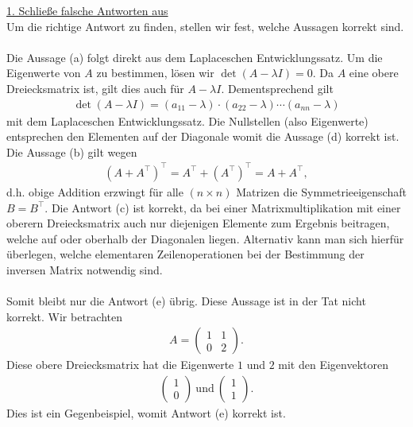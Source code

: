 \underline{1. Schließe falsche Antworten aus}\\
Um die richtige Antwort zu finden, stellen wir fest, welche Aussagen korrekt sind.\\
\\
Die Aussage (a) folgt direkt aus dem Laplaceschen Entwicklungssatz. Um die Eigenwerte von $A$ zu bestimmen, lösen wir $\det(A - \lambda I) = 0$. Da $A$ eine obere Dreiecksmatrix ist, gilt dies auch für $A - \lambda I$. Dementsprechend gilt
\begin{align*}
	\det(A - \lambda I)
	=(a_{11} - \lambda) \cdot (a_{22} - \lambda) \cdots (a_{nn} - \lambda)
\end{align*}
mit dem Laplaceschen Entwicklungssatz. Die Nullstellen (also Eigenwerte) entsprechen den Elementen auf der Diagonale womit die Aussage (d) korrekt ist.
Die Aussage (b) gilt wegen
\begin{align*}
	(A + A^\top)^\top 
	= A^\top + \left( A^\top \right)^\top  
	= A + A^\top,
\end{align*}
d.h. obige Addition erzwingt für alle $(n \times n)$ Matrizen die Symmetrieeigenschaft $B = B^\top$.
Die Antwort (c) ist korrekt, da bei einer Matrixmultiplikation mit einer oberern Dreiecksmatrix auch nur diejenigen Elemente zum Ergebnis beitragen, welche auf oder oberhalb der Diagonalen liegen. Alternativ kann man sich hierfür überlegen, welche elementaren Zeilenoperationen bei der Bestimmung der inversen Matrix notwendig sind.\\
\\
Somit bleibt nur die Antwort (e) übrig. Diese Aussage ist in der Tat nicht korrekt.
Wir betrachten
\begin{align*}
	A =
	\begin{pmatrix}
		1 & 1 \\
		0 & 2
	\end{pmatrix}.
\end{align*}
Diese obere Dreiecksmatrix hat die Eigenwerte $1$ und $2$ mit den Eigenvektoren
\begin{align*}
	\begin{pmatrix}
		1\\
		0
	\end{pmatrix}
	\ \text{und} \
	\begin{pmatrix}
		1\\
		1
	\end{pmatrix}.
\end{align*}
Dies ist ein Gegenbeispiel, womit Antwort (e) korrekt ist.

